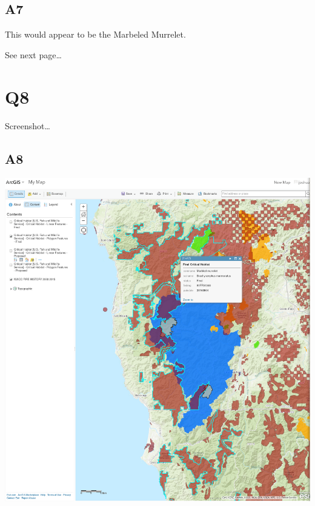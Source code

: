 \documentclass{article}
\begin{document}
\subsection*{A7}
This would appear to be the Marbeled Murrelet.

See next page\ldots

\newpage
\section*{Q8}
Screenshot\ldots

\subsection*{A8}
\includegraphics[width=\textwidth]{map}
\end{document}
